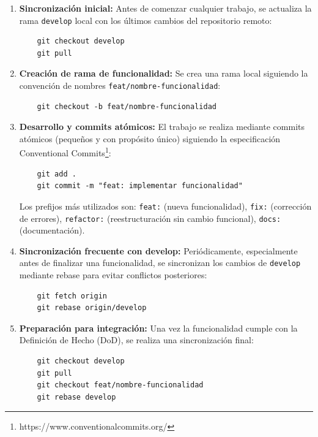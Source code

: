 \begin{enumerate}
    \item \textbf{Sincronización inicial:} Antes de comenzar cualquier trabajo, 
    se actualiza la rama \texttt{develop} local con los últimos cambios del repositorio remoto:
    \begin{verbatim}
    git checkout develop
    git pull
    \end{verbatim}
    
    \item \textbf{Creación de rama de funcionalidad:} Se crea una rama local 
    siguiendo la convención de nombres \texttt{feat/nombre-funcionalidad}:
    \begin{verbatim}
    git checkout -b feat/nombre-funcionalidad
    \end{verbatim}
    
    \item \textbf{Desarrollo y commits atómicos:} El trabajo se realiza mediante 
    commits atómicos (pequeños y con propósito único) siguiendo la especificación 
    Conventional Commits\footnote{https://www.conventionalcommits.org/}:
    \begin{verbatim}
    git add .
    git commit -m "feat: implementar funcionalidad"
    \end{verbatim}
    
    Los prefijos más utilizados son: \texttt{feat:} (nueva funcionalidad), 
    \texttt{fix:} (corrección de errores), \texttt{refactor:} (reestructuración 
    sin cambio funcional), \texttt{docs:} (documentación).
    
    \item \textbf{Sincronización frecuente con develop:} Periódicamente, 
    especialmente antes de finalizar una funcionalidad, se sincronizan los 
    cambios de \texttt{develop} mediante rebase para evitar conflictos posteriores:
    \begin{verbatim}
    git fetch origin
    git rebase origin/develop
    \end{verbatim}
    
    \item \textbf{Preparación para integración:} Una vez la funcionalidad cumple 
    con la Definición de Hecho (DoD), se realiza una sincronización final:
    \begin{verbatim}
    git checkout develop
    git pull
    git checkout feat/nombre-funcionalidad
    git rebase develop
    \end{verbatim}
    

\end{enumerate}
